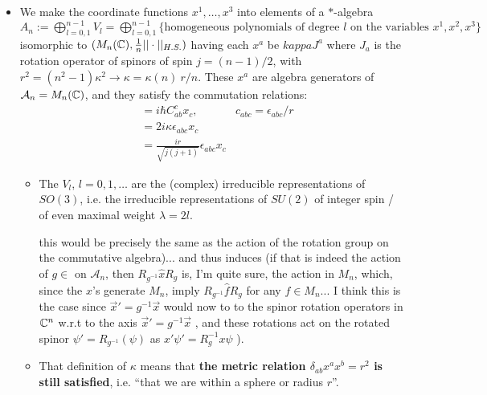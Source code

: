 \documentclass{article}
\begin{document}
\begin{itemize}
\begin{itemize}
        \end{itemize}
    
    \item We make the coordinate functions $x^1, \dots, x^3$ into elements of a $*$-algebra $A_n := \bigoplus_{l = 0, 1}^{n-1} V_l = \bigoplus_{l = 0, 1}^{n-1} \{\text{homogeneous polynomials of degree } l \text{ on the variables } x^1, x^2, x^3\}$ isomorphic to $(M_n(\mathbb{C}), \frac{1}{n}||\cdot||_{H.S.} )$ having each $x^a$ be $
    kappa J^a$ where $J_a$ is the rotation operator of spinors of spin $j = (n-1)/2$, with $r^2 = (n^2-1)\kappa^2 \rightarrow \kappa = \kappa(n) ~ r/n$. These $x^a$ are algebra generators of $\mathcal A_n = M_n(\mathbb{C})$, and they satisfy the commutation relations:
    \begin{align}
    [x_a, x_b] &= i \hbar C^c_{ab}x_c, &c_{abc} = \epsilon_{abc}/r   \\
               &= 2i \kappa \epsilon_{abc} x_c\\
               &= \frac{ir}{\sqrt{j(j+1)}} \epsilon_{abc}x_c
    \end{align}
    
    
    
        \begin{itemize}
        
        \item The $V_l$, $l = 0, 1, \dots$ are the (complex) irreducible representations of $SO(3)$, i.e. the irreducible representations of $SU(2)$ of integer spin / of even maximal weight $\lambda = 2l$.
        
         this would be precisely the same as the action of the rotation group on the commutative algebra)... and thus induces  (if that is indeed the action of $g \in $ on $\mathcal A_n$, then $R_{g^{-1}}\hat x R_g$ is, I'm quite sure, the action in $M_n$, which, since the $\hat x$'s generate $M_n$, imply $R_{g^{-1}}\hat f R_g$ for any $f \in M_n$... \tiny{I think this is the case since $\vec x' = g^{-1}\vec x$ would now to to the spinor rotation operators in $\mathbb{C}^n$ w.r.t to the axis $\vec x' = g^{-1} \vec x$ }, and these rotations act on the rotated spinor $\psi' = R_{g^{-1}}(\psi)$ as $x'\psi' = R_g^{-1}x\psi$ ).
        
        \item That definition of $\kappa$ means that \textbf{the metric relation $\delta_{ab}x^a x^b = r^2$ is still satisfied}, i.e. ``that we are within a sphere or radius $r$''.
            

\end{itemize}
\end{itemize}
\end{document}
